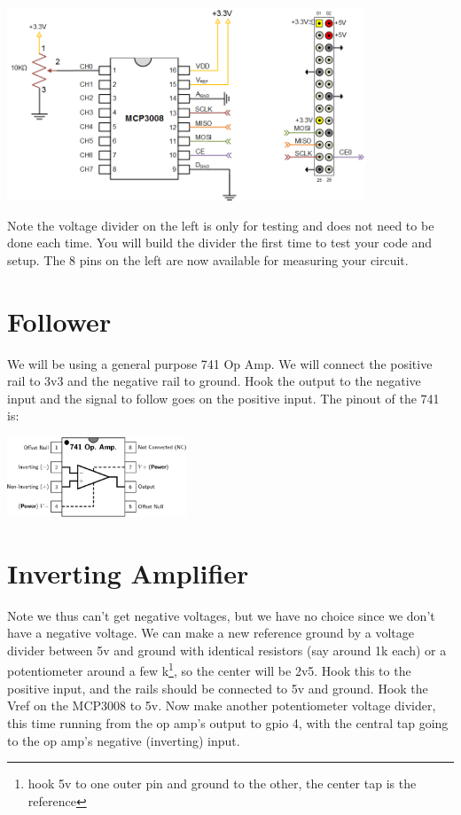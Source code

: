 \includegraphics[width=0.8\textwidth]{../images/mcp3008_circuit.png} 

Note the voltage divider on the left is only for testing and does not need to be done each time.  You will build the divider the first time to test your code and setup.  The 8 pins on the left are now available for measuring your circuit.

\section{Follower}

We will be using a general purpose 741 Op Amp.  We will connect the positive rail to 3v3 and the negative rail to ground.  Hook the output to the negative input and the signal to follow goes on the positive input.  The pinout of the 741 is:

\includegraphics[width=0.4\textwidth]{../images/300px-Generic_741_pinout_top.png} 


\section{Inverting Amplifier}

Note we thus can't get negative voltages, but we have no choice since we don't have a negative voltage.  We can make a new reference ground by a voltage divider between 5v and ground with identical resistors (say around 1k each) or a potentiometer around a few k\footnote{hook 5v to one outer pin and ground to the other, the center tap is the reference}, so the center will be 2v5.  Hook this to the positive input, and the rails should be connected to 5v and ground.  Hook the Vref on the MCP3008 to 5v.  Now make another potentiometer voltage divider, this time running from the op amp's output to gpio 4, with the central tap going to the op amp's negative (inverting) input.



